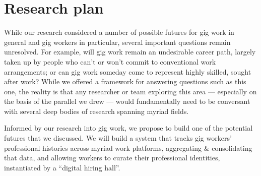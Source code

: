 \documentclass{article}
\newcommand{\topic}[1]{{\color{Blue}#1}}
\begin{document}
\section*{Research plan}
\topic{While our research considered a number of possible futures for gig work in general and gig workers in particular,
several important questions remain unresolved.}
For example, will gig work remain an undesirable career path,
largely taken up by people who can't or won't commit to conventional work arrangements;
or can gig work someday come to represent highly skilled, sought after work?
While we offered a framework for answering questions such as this one, the reality is that
any researcher or team exploring this area
--- especially on the basis of the parallel we drew ---
would fundamentally need to be conversant with several deep bodies of research spanning myriad fields.

Informed by our research into gig work, we propose to build one of the potential futures that we discussed.
\topic{We will build a system that tracks gig workers' professional histories across myriad work platforms,
aggregating \& consolidating that data, and
allowing workers to curate their professional identities, instantiated by a ``digital hiring hall''.}
\end{document}
